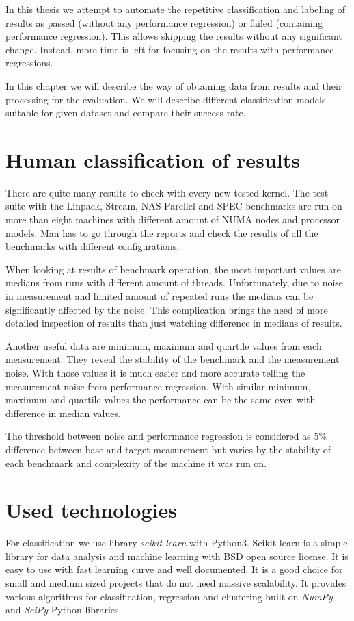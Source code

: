 In this thesis we attempt to automate the repetitive classification and
labeling of results as passed (without any performance regression) or failed
(containing performance regression). This allows skipping the results without
any significant change. Instead, more time is left for focusing on the results
with performance regressions.

In this chapter we will describe the way of obtaining data from results and
their processing for the evaluation. We will describe different classification
models suitable for given dataset and compare their success rate.

\section{Human classification of results}
There are quite many results to check with every new tested kernel. The test
suite with the Linpack, Stream, NAS Parellel and SPEC benchmarks are run on more
than eight machines with different amount of NUMA nodes and processor models.
Man has to go through the reports and check the results of all the benchmarks
with different configurations.

When looking at results of benchmark operation, the most important values are
medians from runs with different amount of threads. Unfortunately, due to noise in measurement
and limited amount of repeated runs the medians can be significantly affected by
the noise. This complication brings the need of more detailed inspection of
results than just watching difference in medians of results.

Another useful data are minimum, maximum and quartile values from each
measurement. They reveal the stability of the benchmark and the measurement
noise. With those values it is much easier and more accurate telling the
measurement noise from performance regression. With similar minimum, maximum and
quartile values the performance can be the same even with difference in median values.

The threshold between noise and performance regression is considered as 5\%
difference between base and target measurement but varies by the stability of
each benchmark and complexity of the machine it was run on.

\section{Used technologies}
For classification we use library \emph{scikit-learn}\;\cite{scikit-learn} with
Python3. Scikit-learn is a simple library for data analysis and machine learning
with BSD open source license. It is easy to use with fast learning curve and
well documented. It is a good choice for small and medium sized projects that do
not need massive scalability. It provides various algorithms for classification,
regression and clustering built on \emph{NumPy} and \emph{SciPy} Python
libraries.

